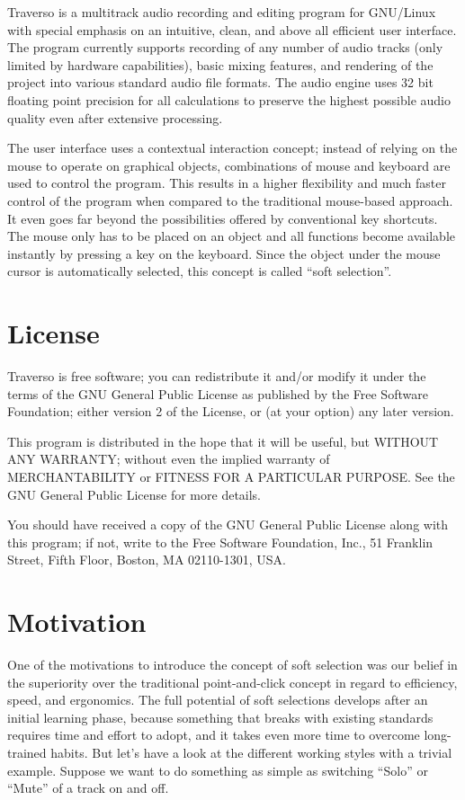 Traverso is a multitrack audio recording and editing program for GNU/Linux with special emphasis on an intuitive, clean, and above all efficient user interface. The program currently supports recording of any number of audio tracks (only limited by hardware capabilities), basic mixing features, and rendering of the  project into various standard audio file formats. The audio engine uses 32 bit floating point precision for all calculations to preserve the highest possible audio quality even after extensive processing.

The user interface uses a contextual interaction concept; instead of relying on the mouse to operate on graphical objects, combinations of mouse and keyboard are used to control the program. This results in a higher flexibility and much faster control of the program when compared to the traditional mouse-based approach. It even goes far beyond the possibilities offered by conventional key shortcuts. The mouse only has to be placed on an object and all functions become available instantly by pressing a key on the keyboard. Since the object under the mouse cursor is automatically selected, this concept is called ``soft selection''.

\section{License}
Traverso is free software; you can redistribute it and/or modify it under the terms of the GNU General Public License as published by the Free Software Foundation; either version 2 of the License, or (at your option) any later version.

This program is distributed in the hope that it will be useful, but WITHOUT ANY WARRANTY; without even the implied warranty of MERCHANTABILITY or FITNESS FOR A PARTICULAR PURPOSE.  See the GNU General Public License for more details.

You should have received a copy of the GNU General Public License along with this program; if not, write to the Free Software Foundation, Inc., 51 Franklin Street, Fifth Floor, Boston, MA  02110-1301, USA.

\section{Motivation}
One of the motivations to introduce the concept of soft selection was our belief in the superiority over the traditional point-and-click concept in regard to efficiency, speed, and ergonomics. The full potential of soft selections develops after an initial learning phase, because something that breaks with existing standards requires time and effort to adopt, and it takes even more time to overcome long-trained habits. But let's have a look at the different working styles with a trivial example. Suppose we want to do something as simple as switching ``Solo'' or ``Mute'' of a track on and off.

